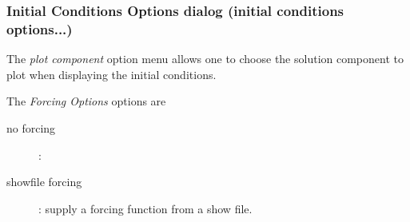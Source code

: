 \subsubsection{Initial Conditions Options dialog (initial conditions options...)}\label{sec:initialConditionsOptions}


\noindent The {\em plot component} option menu allows one to choose the solution
component to plot when displaying the initial conditions.

\noindent The {\em Forcing Options} options are
\begin{description}
  \item[\qquad no forcing] : 
  \item[\qquad showfile forcing] : supply a forcing function from a show file.
\end{description}


